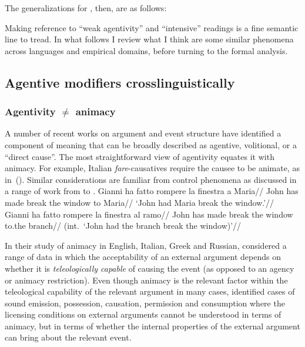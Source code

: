 {The generalizations for {\tpie}, then, are as follows:

Making reference to ``weak agentivity'' and ``intensive'' readings is a fine semantic line to tread. In what follows I review what I think are some similar phenomena across languages and empirical domains, before turning to the formal analysis.

	\subsection{Agentive modifiers crosslinguistically} \label{voice:tpiel:act}

		\subsubsection{Agentivity $\ne$ animacy}
A number of recent works on argument and event structure have identified a component of meaning that can be broadly described as agentive, volitional, or a ``direct cause''. The most straightforward view of agentivity equates it with animacy. For example, Italian \emph{fare}-causatives require the causee to be animate, as in~(\nextx). Similar considerations are familiar from control phenomena as discussed in a range of work from \cite{farkas88} to \cite{zu18phd}.
\pex
	\a \begingl
		\gla Gianni ha fatto rompere la finestra a Maria//
		\glb John has made break the window to Maria//
		\glft `John had Maria break the window.'//
		\endgl
	\a \begingl
		\gla \ljudge{\#}Gianni ha fatto rompere la finestra al ramo//
		\glb John has made break the window to.the branch//
		\glft (int.~`John had the branch break the window)'//
		\endgl
\xe	

In their study of animacy in English, Italian, Greek and Russian, \cite{folliharley08} considered a range of data in which the acceptability of an external argument depends on whether it is \emph{teleologically capable} of causing the event (as opposed to an agency or animacy restriction). Even though animacy is the relevant factor within the teleological capability of the relevant argument in many cases, \cite{folliharley08} identified cases of sound emission, possession, causation, permission and consumption where the licensing conditions on external arguments cannot be understood in terms of animacy, but in terms of whether the internal properties of the external argument can bring about the relevant event.

}
